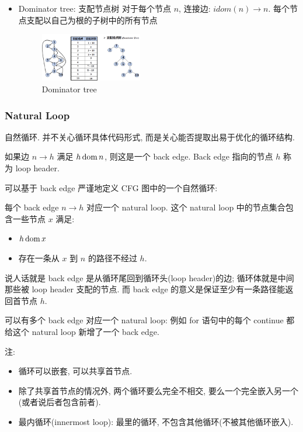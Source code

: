 \begin{itemize}
    \item Dominator tree: 支配节点树
    \subitem 对于每个节点 $n$, 连接边: $idom(n)\to n$.
    \subitem 每个节点支配以自己为根的子树中的所有节点
    \begin{figure}[!htb]
        \centering
        \includegraphics[width=0.42\textwidth]{pic/CP18/Dominator tree}
        \caption{Dominator tree}
    \end{figure}
\end{itemize}


\subsubsection{Natural Loop}
自然循环. 并不关心循环具体代码形式, 而是关心能否提取出易于优化的循环结构. 

如果边 $n\to h$ 满足 $h \operatorname*{dom} n$, 则这是一个 back edge. Back edge 指向的节点 $h$ 称为 loop header.

可以基于 back edge 严谨地定义 CFG 图中的一个自然循环: 
\begin{definition}
    每个 back edge $n\to h$ 对应一个 natural loop. 这个 natural loop 中的节点集合包含一些节点 $x$ 满足: 
\begin{itemize}
    \item $h \operatorname*{dom} x$
    \item 存在一条从 $x$ 到 $n$ 的路径不经过 $h$. 
\end{itemize}
\end{definition}


说人话就是 back edge 是从循环尾回到循环头(loop header)的边; 循环体就是中间那些被 loop header 支配的节点.  而 back edge 的意义是保证至少有一条路径能返回首节点 $h$. 

可以有多个 back edge 对应一个 natural loop: 例如 for 语句中的每个 continue 都给这个 natural loop 新增了一个 back edge.

注:
\begin{itemize}
    \item 循环可以嵌套, 可以共享首节点.
    \item 除了共享首节点的情况外, 两个循环要么完全不相交, 要么一个完全嵌入另一个(或者说后者包含前者). 
    \item 最内循环(innermost loop): 最里的循环, 不包含其他循环(不被其他循环嵌入). 
\end{itemize}


